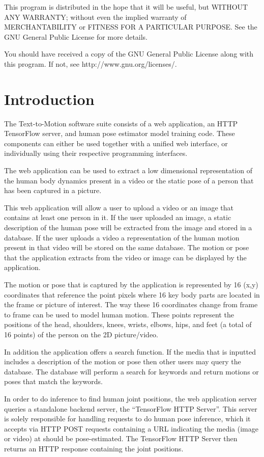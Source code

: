 \documentclass{scrreprt}
\begin{document}
This program is distributed in the hope that it will be useful, but WITHOUT ANY
WARRANTY; without even the implied warranty of MERCHANTABILITY or FITNESS FOR A
PARTICULAR PURPOSE.  See the GNU General Public License for more details.

You should have received a copy of the GNU General Public License along with
this program.  If not, see http://www.gnu.org/licenses/.


\section{Introduction}

The Text-to-Motion software suite consists of a web application, an HTTP
TensorFlow server, and human pose estimator model training code. These
components can either be used together with a unified web interface, or
individually using their respective programming interfaces.

The web application can be used to extract a low dimensional representation of
the human body dynamics present in a video or the static pose of a person that
has been captured in a picture.

This web application will allow a user to upload a video or an image that
contains at least one person in it. If the user uploaded an image, a static
description of the human pose will be extracted from the image and stored in a
database. If the user uploads a video a representation of the human motion
present in that video will be stored on the same database.  The motion or pose
that the application extracts from the video or image can be displayed by the
application.

The motion or pose that is captured by the application is represented by 16
(x,y) coordinates that reference the point pixels where 16 key body parts are
located in the frame or picture of interest.  The way these 16 coordinates
change from frame to frame can be used to model human motion.  These points
represent the positions of the head, shoulders, knees, wrists, elbows, hips,
and feet (a total of 16 points) of the person on the 2D picture/video.

In addition the application offers a search function.  If the media that is
inputted includes a description of the motion or pose then other users may
query the database.  The database will perform a search for keywords and return
motions or poses that match the keywords.

In order to do inference to find human joint positions, the web application
server queries a standalone backend server, the ``TensorFlow HTTP Server''.
This server is solely responsible for handling requests to do human pose
inference, which it accepts via HTTP POST requests containing a URL indicating
the media (image or video) at should be pose-estimated. The TensorFlow HTTP
Server then returns an HTTP response containing the joint positions.
\end{document}
